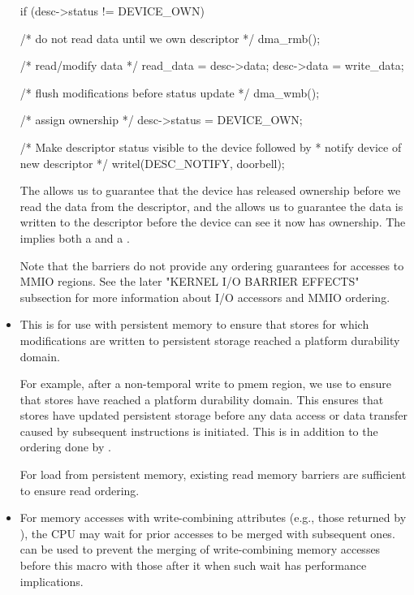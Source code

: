 \begin{itemize}
\begin{VerbatimU}
	if (desc->status != DEVICE_OWN) {
		/* do not read data until we own descriptor */
		dma_rmb();

		/* read/modify data */
		read_data = desc->data;
		desc->data = write_data;

		/* flush modifications before status update */
		dma_wmb();

		/* assign ownership */
		desc->status = DEVICE_OWN;

		/* Make descriptor status visible to the device followed by
		 * notify device of new descriptor
		 */
		writel(DESC_NOTIFY, doorbell);
	}
\end{VerbatimU}

     The  allows us to guarantee that the device has released
     ownership before we read the data from the descriptor, and the
      allows us to guarantee the data is written to the
     descriptor before the device can see it now has ownership.
     The  implies both a  and a .

     Note that the  barriers do not provide any ordering
     guarantees for accesses to MMIO regions.
     See the later "KERNEL I/O BARRIER EFFECTS" subsection for more
     information about I/O accessors and MMIO ordering.

 \item {}

     This is for use with persistent memory to ensure that stores for which
     modifications are written to persistent storage reached a platform
     durability domain.

     For example, after a non-temporal write to pmem region, we use
      to ensure that stores have reached a platform
     durability domain.
     This ensures that stores have updated persistent storage before any
     data access or data transfer caused by subsequent instructions is
     initiated.
     This is in addition to the ordering done by .

     For load from persistent memory, existing read memory barriers are
     sufficient to ensure read ordering.

 \item {}

     For memory accesses with write-combining attributes (e.g., those returned
     by ), the CPU may wait for prior accesses to be merged
     with subsequent ones.
      can be used to prevent the merging of write-combining
     memory accesses before this macro with those after it when such wait
     has performance implications.
\end{itemize}


